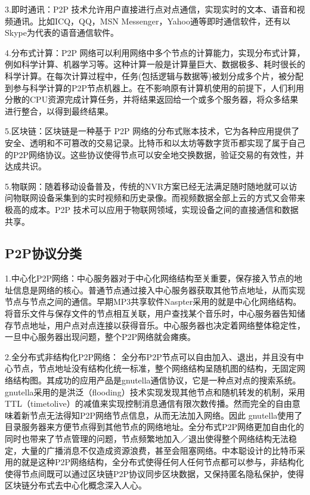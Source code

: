 \documentclass[a4paper,twoside]{scrbook}
\begin{document}
\begin{CJK}{UTF8}{gbsn}
3.即时通讯：P2P 技术允许用户直接进行点对点通信，实现实时的文本、语音和视频通讯。比如ICQ，QQ，MSN Messenger，Yahoo通等即时通信软件，还有以Skype为代表的语音通信软件。

4.分布式计算：P2P 网络可以利用网络中多个节点的计算能力，实现分布式计算，例如科学计算、机器学习等。这种计算一般是计算量巨大、数据极多、耗时很长的科学计算。在每次计算过程中，任务(包括逻辑与数据等)被划分成多个片，被分配到参与科学计算的P2P节点机器上。在不影响原有计算机使用的前提下，人们利用分散的CPU资源完成计算任务，并将结果返回给一个或多个服务器，将众多结果进行整合，以得到最终结果。

5.区块链：区块链是一种基于 P2P 网络的分布式账本技术，它为各种应用提供了安全、透明和不可篡改的交易记录。比特币和以太坊等数字货币都实现了属于自己的P2P网络协议。这些协议使得节点可以安全地交换数据，验证交易的有效性，并达成共识。

5.物联网：随着移动设备普及，传统的NVR方案已经无法满足随时随地就可以访问物联网设备采集到的实时视频和历史录像。而视频数据全部上云的方式又会带来极高的成本。P2P 技术可以应用于物联网领域，实现设备之间的直接通信和数据共享。

\subsection{P2P协议分类}
1.中心化P2P网络：中心服务器对于中心化网络结构至关重要，保存接入节点的地址信息是网络的核心。普通节点通过接入中心服务器获取其他节点地址，从而实现节点与节点之间的通信。早期MP3共享软件Naspter采用的就是中心化网络结构。将音乐文件与保存文件的节点相互关联，用户查找某个音乐时，中心服务器告知储存节点地址，用户点对点连接以获得音乐。中心服务器也决定着网络整体稳定性，一旦中心服务器出现问题，整个P2P网络就会瘫痪。

2.全分布式非结构化P2P网络： 全分布P2P节点可以自由加入、退出，并且没有中心节点，节点地址没有结构化统一标准，整个网络结构呈随机图的结构，无固定网络结构图。其成功的应用产品是gnutella通信协议，它是一种点对点的搜索系统。gnutella采用的是洪泛（flooding）技术实现发现其他节点和随机转发的机制，采用 TTL（timetolive）的减值来实现控制消息通信有限次数传播。然而完全的自由意味着新节点无法得知P2P网络节点信息，从而无法加入网络。因此 gnutella使用了目录服务器来方便节点得到其他节点的网络地址。全分布式P2P网络更加自由化的同时也带来了节点管理的问题，节点频繁地加入／退出使得整个网络结构无法稳定，大量的广播消息不仅造成资源浪费，甚至会阻塞网络。中本聪设计的比特币采用的就是这种P2P网络结构，全分布式使得任何人任何节点都可以参与，非结构化使得节点间既可以通过区块链P2P协议同步区块数据，又保持匿名隐私保护，使得区块链分布式去中心化概念深入人心。


\end{CJK}
\end{document}
